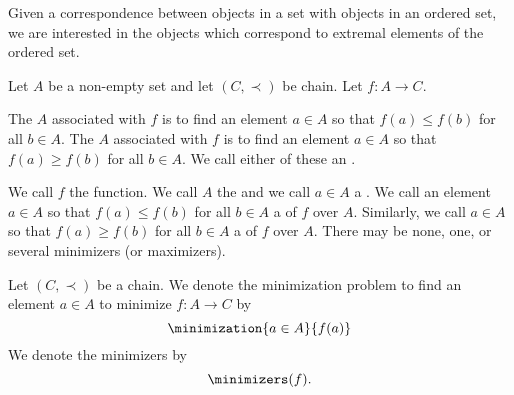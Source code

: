 
\sbasic










\sstart
{}


Given a correspondence between
objects in a set with objects
in an ordered set, we are interested
in the objects which correspond to
extremal elements of the ordered set.


Let $A$ be a non-empty set
and let $(C, \prec)$ be chain.
Let $f: A \to C$.

The 
 $A$ associated with
$f$ is to find an element
$a \in A$ so that
$f(a) \leq f(b)$ for all $b \in A$.
The 
 $A$ associated with
$f$ is to find an element
$a \in A$ so that
$f(a) \geq f(b)$ for all $b \in A$.
We call either of these
an .

We call $f$ the 
function.
We call $A$ the
 and we call $a \in A$ a
.
We call an element
$a \in A$ so that $f(a) \leq f(b)$
for all $b \in A$ a 
of $f$ over $A$. Similarly, we call
$a \in A$ so that $f(a) \geq f(b)$
for all $b \in A$ a 
of $f$ over $A$.
There may be none, one, or several
minimizers (or maximizers).


Let $(C, \prec)$ be
a chain.
We denote the minimization
problem to find
an element $a \in A$
to minimize $f: A \to C$ by
\[
  \minimization{a \in A}{f(a)}
\]
We denote the minimizers by
\[
  \minimizers(f).
\]
\strats
